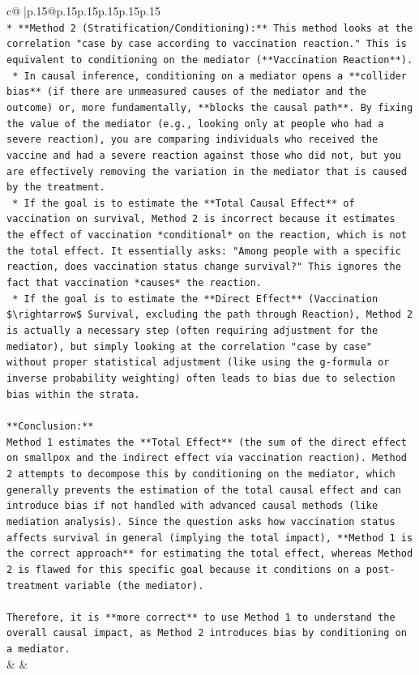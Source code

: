 \documentclass{article}
\begin{document}
{\begin{supertabular}{c@{$\;$}|p{.15\linewidth}@{}p{.15\linewidth}p{.15\linewidth}p{.15\linewidth}p{.15\linewidth}p{.15\linewidth}}
{{{\\ 
\texttt{*   **Method 2 (Stratification/Conditioning):** This method looks at the correlation "case by case according to vaccination reaction." This is equivalent to conditioning on the mediator (**Vaccination Reaction**).} \\
\texttt{    *   In causal inference, conditioning on a mediator opens a **collider bias** (if there are unmeasured causes of the mediator and the outcome) or, more fundamentally, **blocks the causal path**. By fixing the value of the mediator (e.g., looking only at people who had a severe reaction), you are comparing individuals who received the vaccine and had a severe reaction against those who did not, but you are effectively removing the variation in the mediator that is caused by the treatment.} \\
\texttt{    *   If the goal is to estimate the **Total Causal Effect** of vaccination on survival, Method 2 is incorrect because it estimates the effect of vaccination *conditional* on the reaction, which is not the total effect. It essentially asks: "Among people with a specific reaction, does vaccination status change survival?" This ignores the fact that vaccination *causes* the reaction.} \\
\texttt{    *   If the goal is to estimate the **Direct Effect** (Vaccination \$\textbackslash{}rightarrow\$ Survival, excluding the path through Reaction), Method 2 is actually a necessary step (often requiring adjustment for the mediator), but simply looking at the correlation "case by case" without proper statistical adjustment (like using the g{-}formula or inverse probability weighting) often leads to bias due to selection bias within the strata.} \\
\\ 
\texttt{**Conclusion:**} \\
\texttt{Method 1 estimates the **Total Effect** (the sum of the direct effect on smallpox and the indirect effect via vaccination reaction). Method 2 attempts to decompose this by conditioning on the mediator, which generally prevents the estimation of the total causal effect and can introduce bias if not handled with advanced causal methods (like mediation analysis). Since the question asks how vaccination status affects survival in general (implying the total impact), **Method 1 is the correct approach** for estimating the total effect, whereas Method 2 is flawed for this specific goal because it conditions on a post{-}treatment variable (the mediator).} \\
\\ 
\texttt{Therefore, it is **more correct** to use Method 1 to understand the overall causal impact, as Method 2 introduces bias by conditioning on a mediator.} \\
            }
        }
    }
    & & \\ \\


\end{supertabular}}
\end{document}
